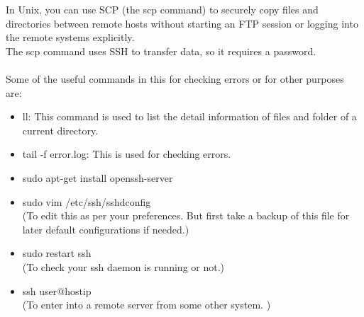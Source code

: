 In Unix, you can use SCP (the scp command) to securely copy files and directories between remote hosts without starting an FTP session or logging into the remote systems explicitly. \\
The scp command uses SSH to transfer data, so it requires a password.\\\\
Some of the useful commands in this for checking errors or for other purposes are: \\
\begin{itemize}
\item ll: This command is used to list the detail information of files and folder of a current directory. 
\item tail -f error.log: This is used for checking errors.
\item sudo apt-get install openssh-server
\item sudo vim /etc/ssh/sshdconfig \\
(To edit this as per your preferences. But first take a backup of this file for later default configurations if needed.)
\item sudo restart ssh \\
(To check your ssh daemon is running or not.)

\item ssh user@hostip \\
(To enter into a remote server from some other system. )
\end{itemize}

 
